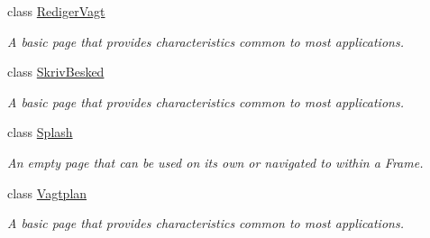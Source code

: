 \begin{DoxyCompactItemize}
class \hyperlink{class__1aarsproeve_1_1_view_1_1_rediger_vagt}{Rediger\+Vagt}
\begin{DoxyCompactList}\small\item\em A basic page that provides characteristics common to most applications. \end{DoxyCompactList}\item 
class \hyperlink{class__1aarsproeve_1_1_view_1_1_skriv_besked}{Skriv\+Besked}
\begin{DoxyCompactList}\small\item\em A basic page that provides characteristics common to most applications. \end{DoxyCompactList}\item 
class \hyperlink{class__1aarsproeve_1_1_view_1_1_splash}{Splash}
\begin{DoxyCompactList}\small\item\em An empty page that can be used on its own or navigated to within a Frame. \end{DoxyCompactList}\item 
class \hyperlink{class__1aarsproeve_1_1_view_1_1_vagtplan}{Vagtplan}
\begin{DoxyCompactList}\small\item\em A basic page that provides characteristics common to most applications. \end{DoxyCompactList}\end{DoxyCompactItemize}
